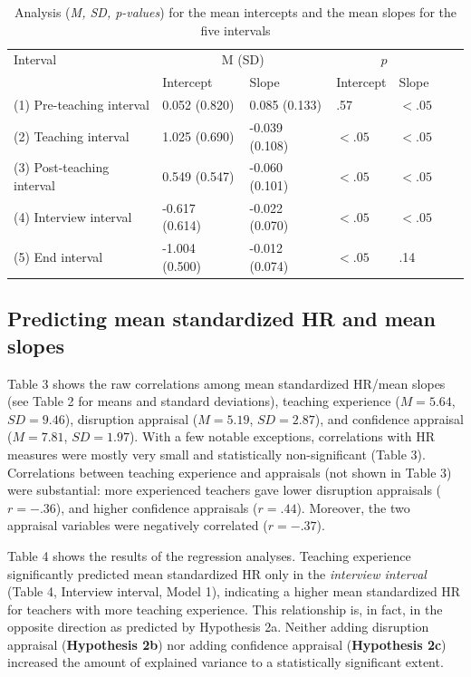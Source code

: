 \documentclass[preprint, 3p,
sort,]{elsarticle} %
\begin{document}
\renewcommand{\arraystretch}{1.5} 

\begin{table}[ht]
    \centering
    \begin{tabularx}{\textwidth}{lXXXXXX}
        \toprule
        Interval  & \multicolumn{2}{c}{M (SD)} & \multicolumn{2}{c}{$p$} \\ & Intercept & Slope & Intercept & Slope \\
        \midrule
        (1) Pre-teaching interval & 0.052 (0.820) & 0.085 (0.133) & .57 & $< .05$ \\
        (2) Teaching interval & 1.025 (0.690) & -0.039 (0.108) & $< .05$ & $< .05$ \\
        (3) Post-teaching interval & 0.549 (0.547) & -0.060 (0.101) & $< .05$ & $< .05$ \\
        (4) Interview interval & -0.617 (0.614) & -0.022 (0.070) & $< .05$ & $< .05$ \\
        (5) End interval & -1.004 (0.500) & -0.012 (0.074) & $< .05$ & .14 \\
        \bottomrule
    \end{tabularx}
    \caption{Analysis (\textit{M, SD, p-values}) for the mean intercepts and the mean slopes for the five intervals }
    \label{tab_2}
\end{table}

\subsection{Predicting mean standardized HR and mean
slopes}\label{predicting-mean-standardized-hr-and-mean-slopes}

Table 3 shows the raw correlations among mean standardized HR/mean
slopes (see Table 2 for means and standard deviations), teaching
experience (\(M = 5.64\), \(SD = 9.46\)), disruption appraisal
(\(M = 5.19\), \(SD = 2.87\)), and confidence appraisal (\(M = 7.81\),
\(SD = 1.97\)). With a few notable exceptions, correlations with HR
measures were mostly very small and statistically non-significant (Table
3). Correlations between teaching experience and appraisals (not shown
in Table 3) were substantial: more experienced teachers gave lower
disruption appraisals (\(r = -.36\)), and higher confidence appraisals
(\(r = .44\)). Moreover, the two appraisal variables were negatively
correlated (\(r = -.37\)).

Table 4 shows the results of the regression analyses. Teaching
experience significantly predicted mean standardized HR only in the
\emph{interview interval} (Table 4, Interview interval, Model 1),
indicating a higher mean standardized HR for teachers with more teaching
experience. This relationship is, in fact, in the opposite direction as
predicted by Hypothesis 2a. Neither adding disruption appraisal
(\textbf{Hypothesis 2b}) nor adding confidence appraisal
(\textbf{Hypothesis 2c}) increased the amount of explained variance to a
statistically significant extent.
\end{document}
